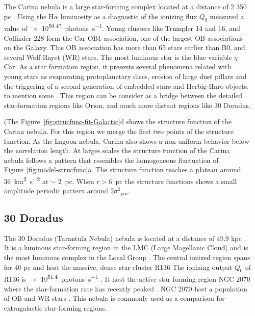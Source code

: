 \documentclass[fleqn,usenatbib, useAMS, a4paper]{mnras}
\newcommand\pos{\ensuremath{_{\mathrm{pos}}}}
\newcommand\ha{\ensuremath{\text{H}\alpha}}
\begin{document}
The Carina nebula is a large star-forming complex located at a distance of 2 350 pc \citetext{\SI{1}{\arcsecond} = \SI{0.01}{pc} ; \citealp{2006ApJ...644.1151S}}.
Using the \ha{} luminosity as a diagnostic of the ionizing flux \(Q_0\) \citet{2007MNRAS.379.1279S} measured a value of \SI{e50.47}{photons.s^{-1}}.
Young clusters like Trumpler 14 and 16, and Collinder 228 form the Car OB1 association, one of the largest OB associations on the Galaxy.
This OB association has more than 65 stars earlier than B0, and several Wolf-Rayet (WR) stars.
The most luminous star is the blue variable $\eta$ Car.
As a star formation region, it presents several phenomena related with young stars as evaporating protoplanetary discs, erosion of large dust pillars and the triggering of a second generation of embedded stars and Herbig-Haro objects, to mention some \citetext{see \citealp{2008hsf2.book..138S} and reference therein}. 
This region can be consider as a bridge between the detailed star-formation regions like Orion, and much more distant regions like 30 Doradus.

(The Figure~\ref{fig:strucfunc-fit-Galactic}d shows the structure function of the Carina nebula.
For this region we merge the first two points of the structure function.
As the Lagoon nebula, Carina also shows a non-uniform behavior below the correlation length.
At larges scales the structure function of the Carina nebula follows a pattern that resembles the homogeneous fluctuation of Figure~\ref{fig:model-strucfunc}a.
The structure function reaches a plateau around \SI{36}{km^{2}.s^{-2}} at \(\sim\) \SI{2}{pc}.
When \(r >\)\SI{6}{pc} the structure functions shows a small amplitude periodic pattern around 2\(\sigma^2\pos\).

\subsection{30 Doradus}
\label{sec:30-doradus}

The 30 Doradus (Tarantula Nebula) nebula is located at a distance of 49.9 kpc \citetext{\SI{1}{\arcsecond} = \SI{0.24}{pc} ; \citealp{2013Natur.495...76P}}.
It is a luminous star-forming region in the LMC (Large Magellanic Cloud) and is the most luminous complex in the Local Group \citep{1984ApJ...287..116K}.
The central ionized region spans for 40 pc and host the massive, dense star cluster R136 %
The ionizing output \(Q_0\) of R136 is \SI{e51.4}{photons.s^{-1}} \citep{2020MNRAS.499.1918B}.
It host the active star forming region NGC 2070 \citep{2013AJ....145...98W} where the star-formation rate has recently peaked \citep{2015ApJ...811...76C}. 
NGC 2070 host a population of OB and WR stars \citep{2011A&A...530A.108E}.
This nebula is commonly used as a comparison for extragalactic star-forming regions.
\end{document}
